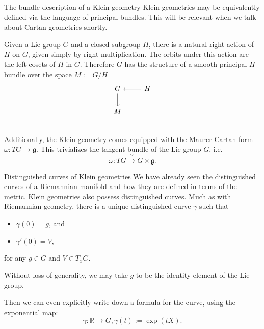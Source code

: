 \documentclass[handout]{beamer}
\newcommand{\RR}{\mathbb{R}}
\begin{document}
\begin{frame}{The bundle description of a Klein geometry}
  Klein geometries may be equivalently defined via the language of principal bundles. 
  This will be relevant when we talk about Cartan geometries shortly. 

  Given a Lie group $G$ and a closed subgroup $H$, there is a natural right action of $H$ on $G$, given simply by right multiplication. 
  The orbits under this action are the left cosets of $H$ in $G$. 
  Therefore $G$ has the structure of a smooth principal $H$-bundle over the space $M:=G/H$
  \[
    \begin{tikzcd}[ampersand replacement=\&]
      G  \arrow[d] \& H \arrow[l]\\
      M \& {} \\
    \end{tikzcd}
  \]
  Additionally, the Klein geometry comes equipped with the Maurer-Cartan form $\omega : TG \to \mathfrak{g}$.
  This trivializes the tangent bundle of the Lie group $G$, i.e. 
  \[
    \omega : TG \overset{\cong}{\longrightarrow} G \times \mathfrak{g}.
  \]
\end{frame}

\begin{frame}{Distinguished curves of Klein geometries}
  We have already seen the distinguished curves of a Riemannian manifold and how they are defined in terms of the metric.
  Klein geometries also possess distinguished curves. 
  Much as with Riemannian geometry, there is a unique distinguished curve $\gamma$ such that 
  \begin{itemize}
    \item $\gamma(0) = g$, and 
    \item $\gamma'(0) = V$,
  \end{itemize}
  for any $g\in G$ and $V \in T_x G$.

  Without loss of generality, we may take $g$ to be the identity element of the Lie group.

  Then we can even explicitly write down a formula for the curve, using the exponential map:
  \[
    \gamma : \RR \to G, \gamma(t) := \exp(tX).
  \]
\end{frame}
\end{document}
